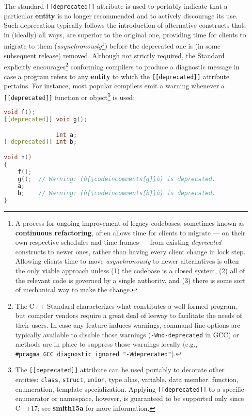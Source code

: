 The standard \texttt{[[deprecated]]} attribute is used to portably
indicate that a particular \textbf{entity} is no longer recommended and
to actively discourage its use. Such deprecation typically follows the
introduction of alternative constructs that, in (ideally) all ways, are
superior to the original one, providing time for clients to migrate to
them (\emph{asynchronously}{\cprotect\footnote{A process for ongoing
improvement of legacy codebases, sometimes known as
\textbf{continuous refactoring}, often allows time for clients to
migrate --- on their own respective schedules and time frames --- from
existing \emph{deprecated} constructs to newer ones, rather than
having every client change in lock step. Allowing clients time to move
\emph{asynchronously} to newer alternatives is often the only viable
approach unless (1) the codebase is a closed system, (2) all of the
relevant code is governed by a single authority, and (3) there is some
  sort of mechanical way to make the change.}}) before the deprecated
one is (in some subsequent release) removed. Although not strictly
required, the Standard explicitly encourages{\cprotect\footnote{The C++
Standard characterizes what constitutes a well-formed program, but
compiler vendors require a great deal of leeway to facilitate the
needs of their users. In case any feature induces warnings,
command-line options are typically available to disable those warnings
(\texttt{-Wno-deprecated} in GCC) or methods are in place to suppress those warnings
locally (e.g.,
  \texttt{\#pragma}~\texttt{GCC}~\texttt{diagnostic}~\texttt{ignored}~\texttt{"-Wdeprecated"}).}}
conforming compilers to produce a diagnostic message in case a program
refers to any \textbf{entity} to which the \texttt{[[deprecated]]}
attribute pertains. For instance, most popular compilers emit a
warning whenever a \texttt{[[deprecated]]} function or
object{\cprotect\footnote{The \texttt{[[deprecated]]} attribute can be
used portably to decorate other entities: \texttt{class},
\texttt{struct}, \texttt{union}, type alias, variable, data member,
function, enumeration, template specialization. Applying
\texttt{[[deprecated]]} to a specific enumerator or namespace,
however, is guaranteed to be supported only since C++17; see
  \textbf{smith15a} for more information.}} is used:

\begin{lstlisting}[language=C++]
               void f();
[[deprecated]] void g();

               int a;
[[deprecated]] int b;

void h()
{
    f();
    g();  // Warning: (ù{\codeincomments{g}}ù) is deprecated.
    a;
    b;    // Warning: (ù{\codeincomments{b}}ù) is deprecated.
}
\end{lstlisting}
    
